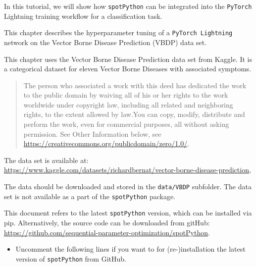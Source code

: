 \documentclass[
  letterpaper,
  DIV=11,
  numbers=noendperiod]{scrreprt}
\providecommand{\tightlist}{%
  \setlength{\itemsep}{0pt}\setlength{\parskip}{0pt}}\usepackage{longtable,booktabs,array}
\begin{document}
In this tutorial, we will show how \texttt{spotPython} can be integrated
into the \texttt{PyTorch} Lightning training workflow for a
classification task.

This chapter describes the hyperparameter tuning of a
\texttt{PyTorch\ Lightning} network on the Vector Borne Disease
Prediction (VBDP) data set.

\begin{tcolorbox}[enhanced jigsaw, left=2mm, title=\textcolor{quarto-callout-important-color}{\faExclamation}\hspace{0.5em}{Vector Borne Disease Prediction Data Set}, bottomrule=.15mm, titlerule=0mm, breakable, rightrule=.15mm, toprule=.15mm, coltitle=black, colbacktitle=quarto-callout-important-color!10!white, leftrule=.75mm, arc=.35mm, colframe=quarto-callout-important-color-frame, bottomtitle=1mm, colback=white, opacitybacktitle=0.6, toptitle=1mm, opacityback=0]

This chapter uses the Vector Borne Disease Prediction data set from
Kaggle. It is a categorical dataset for eleven Vector Borne Diseases
with associated symptoms.

\begin{quote}
The person who associated a work with this deed has dedicated the work
to the public domain by waiving all of his or her rights to the work
worldwide under copyright law, including all related and neighboring
rights, to the extent allowed by law.You can copy, modify, distribute
and perform the work, even for commercial purposes, all without asking
permission. See Other Information below, see
\url{https://creativecommons.org/publicdomain/zero/1.0/}.
\end{quote}

The data set is available at:
\url{https://www.kaggle.com/datasets/richardbernat/vector-borne-disease-prediction},

The data should be downloaded and stored in the \texttt{data/VBDP}
subfolder. The data set is not available as a part of the
\texttt{spotPython} package.

\end{tcolorbox}

This document refers to the latest \texttt{spotPython} version, which
can be installed via pip. Alternatively, the source code can be
downloaded from gitHub:
\url{https://github.com/sequential-parameter-optimization/spotPython}.

\begin{itemize}
\tightlist
\item
  Uncomment the following lines if you want to for (re-)installation the
  latest version of \texttt{spotPython} from GitHub.
\end{itemize}
\end{document}
